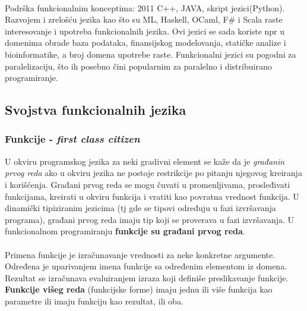 \documentclass[../main.tex]{subfiles}
\begin{document}
\\
	   Podrška funkcionalnim konceptima: 2011 C++, JAVA, skript jezici(Python).\\
	   Razvojem i zrelošću jezika kao što su ML, Haskell, OCaml, F\# i Scala raste interesovanje i upotreba funkcionalnih jezika. Ovi jezici se sada koriste npr u domenima obrade baza podataka, finansijskog modelovanja, statičke analize i bioinformatike, a broj domena upotrebe raste. Funkcionalni jezici su pogodni za paralelizaciju, što ih posebno čini popularnim za paralelno i distribuirano programiranje.
	   
 \subsection{Svojstva funkcionalnih jezika}										%
	   \subsubsection{Funkcije - {\it first class citizen}}									%
	   U okviru programskog jezika za neki gradivni element se kaže da je {\it građanin prvog reda} ako u okviru jezika ne postoje restrikcije po pitanju njegovog kreiranja i korišćenja. Građani prvog reda se mogu čuvati u promenljivama, prosleđivati funkcijama, kreirati u okviru funkcija i vratiti kao povratna vrednost funkcija. U dinamički tipiziranim jezicima (tj gde se tipovi određuju u fazi izvršavanja programa), građani prvog reda imaju tip koji se proverava u fazi izvršavanja. U funkcionalnom programiranju {\bf funkcije su građani prvog reda}.
\\ \\
	   \indent Primena funkcije je izračunavanje vrednosti za neke konkretne argumente. Određena je uparivanjem imena funkcije sa određenim elementom iz domena. Rezultat se izračunava evaluiranjem izraza koji definiše preslikavanje funkcije.
	   \\
	   {\bf Funkcije višeg reda} (funkcijske forme) imaju jednu ili više funkcija kao parametre ili imaju funkciju kao rezultat, ili oba. 
	   
\end{document}
